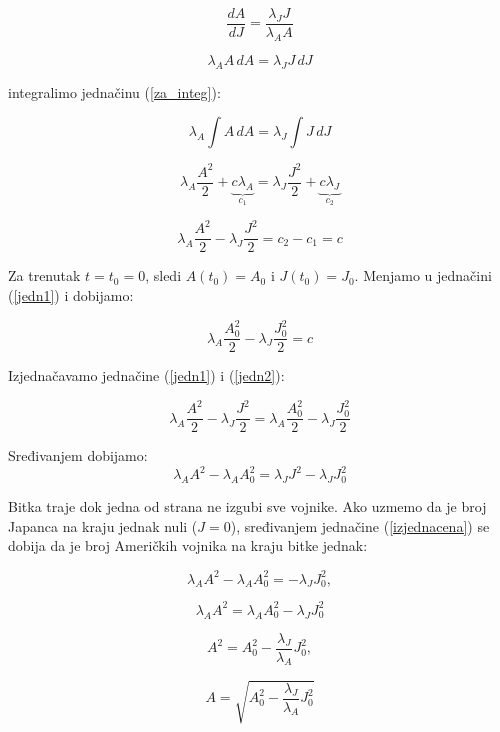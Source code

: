 \documentclass{article}
\begin{document}
\[
  \frac{\displaystyle dA}{\displaystyle dJ} = \frac{\displaystyle \lambda_{J}J}{\displaystyle \lambda_{A}A}
\]

\begin{equation}\label{za_integ}
  \lambda_{A}A\,dA = \lambda_{J}J\,dJ
\end{equation}

integralimo jednačinu (\ref{za_integ}):

\[
  \lambda_{A}\int{} A\,dA = \lambda_{J} \int{} J\,dJ
\]

\[
  \lambda_{A} \frac{\displaystyle A^2}{\displaystyle 2} + \underbrace{c\lambda_{A}}_{c_1}
  = \lambda_{J} \frac{J^2}{2} + \underbrace{c\lambda_{J}}_{c_2}
\]

\begin{equation}\label{jedn1}
  \lambda_{A} \frac{A^2}{2} - \lambda_{J} \frac{J^2}{2} = c_2 - c_1 = c
\end{equation}

Za trenutak \(t = t_0 = 0\), sledi \(A(t_0) = A_0\) i \(J(t_0) = J_0\). Menjamo
u jednačini (\ref{jedn1}) i dobijamo:

\begin{equation}\label{jedn2}
  \lambda_{A}\frac{A_{0}^2}{2} - \lambda_{J}\frac{J_{0}^2}{2} = c
\end{equation}

Izjednačavamo jednačine (\ref{jedn1}) i (\ref{jedn2}):

\[
  \lambda_{A}\frac{A^2}{2} - \lambda_{J}\frac{J^2}{2} =
\lambda_{A}\frac{A_{0}^2}{2} - \lambda_{J}\frac{J_{0}^2}{2}
\]

Sređivanjem dobijamo:
\begin{equation}\label{izjednacena}
  \lambda_{A}A^2 - \lambda_{A}A_{0}^2 = \lambda_{J}J^2 - \lambda_{J}J_{0}^2
\end{equation}

Bitka traje dok jedna od strana ne izgubi sve vojnike. Ako uzmemo da je broj
Japanca na kraju jednak nuli (\(J = 0\)), sređivanjem jednačine
(\ref{izjednacena}) se dobija da je broj Američkih vojnika na kraju bitke
jednak:

\[
  \lambda_{A}A^2 - \lambda_{A}A_{0}^2 = -\lambda_{J}J_{0}^2,
\]

\begin{equation}\label{za_uslov}
  \lambda_{A}A^2 = \lambda_{A}A_0^2 - \lambda_{J}J_0^2
\end{equation}

\[
  A^2 = A_{0}^2 - \frac{\lambda_J}{\lambda_A}J_0^2,
\]

\begin{equation}\label{brojAmeri}
  A = \sqrt{A_{0}^2 - \frac{\lambda_J}{\lambda_A}J_0^2}
\end{equation}
\end{document}
